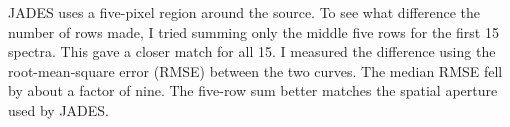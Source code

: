 \documentclass[11pt]{article}
\begin{document}
\noindent
JADES uses a five-pixel region around the source. To see what difference
the number of rows made, I tried summing only the middle five rows for the
first 15 spectra. This gave a closer match for all 15. I measured the difference
using the root-mean-square error (RMSE) between the two curves. The median
RMSE fell by about a factor of nine. The five-row sum better matches the spatial aperture used by JADES.
\end{document}
